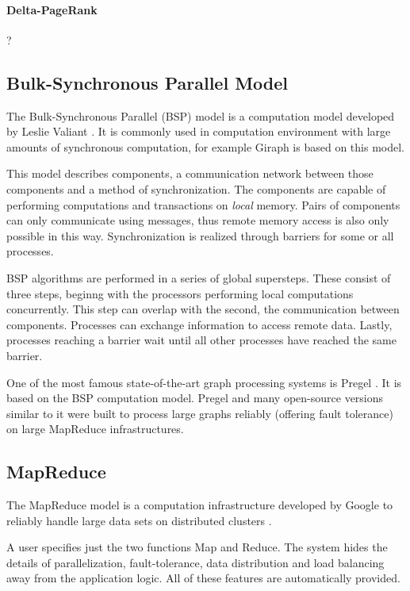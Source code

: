 \paragraph{Delta-PageRank}
?

\subsection{Bulk-Synchronous Parallel Model}
\label{sec:bsp}
The Bulk-Synchronous Parallel (BSP) model is a computation model developed by Leslie Valiant \cite{bsp}. It is commonly used in computation environment with large amounts of synchronous computation, for example Giraph is based on this model.

This model describes components, a communication network between those components and a method of synchronization.
The components are capable of performing computations and transactions on \emph{local} memory. Pairs of components can only communicate using messages, thus remote memory access is also only possible in this way.
Synchronization is realized through barriers for some or all processes.

BSP algorithms are performed in a series of global supersteps. These consist of three steps, beginng with the processors performing local computations concurrently.
This step can overlap with the second, the communication between components. Processes can exchange information to access remote data.
Lastly, processes reaching a barrier wait until all other processes have reached the same barrier.

One of the most famous state-of-the-art graph processing systems is Pregel \cite{pregel}. It is based on the BSP computation model.
Pregel and many open-source versions similar to it were built to process large graphs reliably (offering fault tolerance) on large MapReduce infrastructures.

\subsection{MapReduce}
The MapReduce model is a computation infrastructure developed by Google to reliably handle large data sets on distributed clusters \cite{mapreduce}.

A user specifies just the two functions Map and Reduce.
The system hides the details of parallelization, fault-tolerance, data distribution and load balancing away from the application logic.
All of these features are automatically provided.


